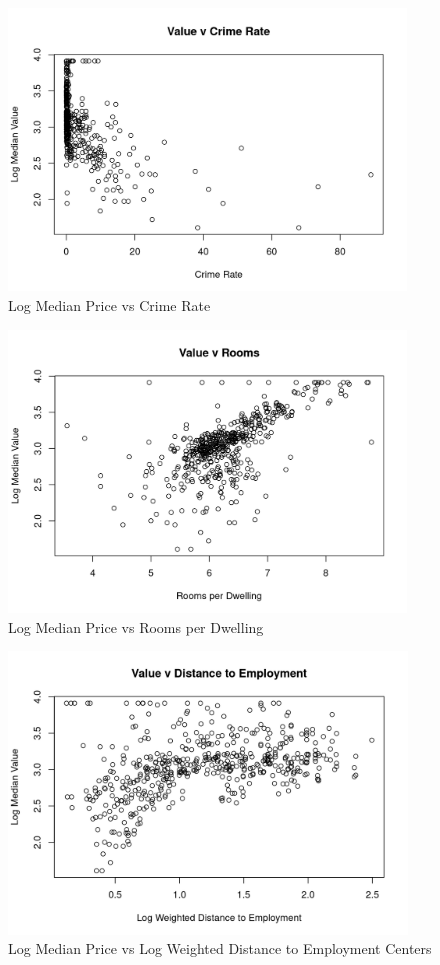 \documentclass[11pt]{article}
\begin{document}
\begin{figure}[h!] 
  \centering
  \includegraphics[height=75mm]{crime.png}
  \caption{Log Median Price vs Crime Rate}
  \label{fig:crime}
\end{figure}

\begin{figure}[h!] 
  \centering
  \includegraphics[height=75mm]{rooms.png}
  \caption{Log Median Price vs Rooms per Dwelling}
  \label{fig:rooms}
\end{figure}

\begin{figure}[h!] 
  \centering
  \includegraphics[height=75mm]{employment.png}
  \caption{Log Median Price vs Log Weighted Distance to Employment Centers}
  \label{fig:employment}
\end{figure}
\end{document}

